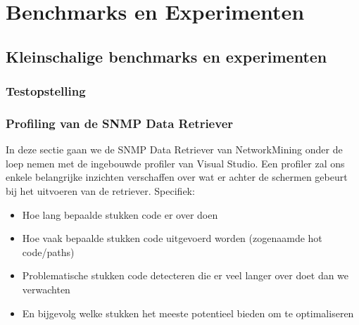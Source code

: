 \chapter{Benchmarks en Experimenten}


\section{Kleinschalige benchmarks en experimenten}

\subsection{Testopstelling}



\subsection{Profiling van de SNMP Data Retriever}

In deze sectie gaan we de SNMP Data Retriever van NetworkMining onder de loep nemen met de ingebouwde profiler van Visual Studio.
Een profiler zal ons enkele belangrijke inzichten verschaffen over wat er achter de schermen gebeurt bij het uitvoeren van de retriever.
Specifiek:

\begin{itemize}
	\item Hoe lang bepaalde stukken code er over doen
	\item Hoe vaak bepaalde stukken code uitgevoerd worden (zogenaamde hot code/paths)
	\item Problematische stukken code detecteren die er veel langer over doet dan we verwachten
	\item En bijgevolg welke stukken het meeste potentieel bieden om te optimaliseren
\end{itemize}


